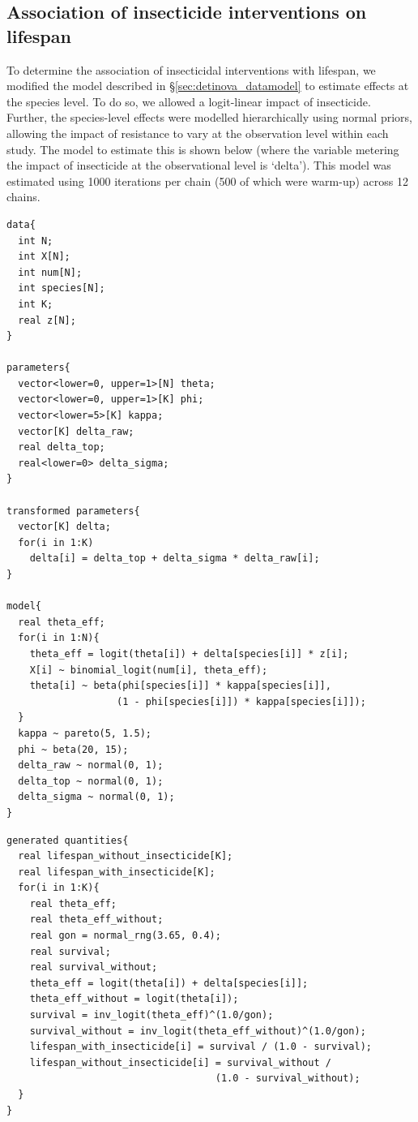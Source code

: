 \documentclass[12pt]{article}
\begin{document}
{\subsection{Association of insecticide interventions on lifespan}\label{sec:detinova_insecticide}
To determine the association of insecticidal interventions with lifespan, we modified the model described in \S\ref{sec:detinova_datamodel} to estimate effects at the species level. To do so, we allowed a logit-linear impact of insecticide. Further, the species-level effects were modelled hierarchically using normal priors, allowing the impact of resistance to vary at the observation level within each study. The model to estimate this is shown below (where the variable metering the impact of insecticide at the observational level is `delta'). This model was estimated using 1000 iterations per chain (500 of which were warm-up) across 12 chains.

\begin{verbatim}
data{
  int N;
  int X[N];
  int num[N];
  int species[N];
  int K;
  real z[N];
}

parameters{
  vector<lower=0, upper=1>[N] theta;
  vector<lower=0, upper=1>[K] phi;
  vector<lower=5>[K] kappa;
  vector[K] delta_raw;
  real delta_top;
  real<lower=0> delta_sigma;
}

transformed parameters{
  vector[K] delta;
  for(i in 1:K)
    delta[i] = delta_top + delta_sigma * delta_raw[i];
}

model{
  real theta_eff;
  for(i in 1:N){
    theta_eff = logit(theta[i]) + delta[species[i]] * z[i];
    X[i] ~ binomial_logit(num[i], theta_eff);
    theta[i] ~ beta(phi[species[i]] * kappa[species[i]],
                   (1 - phi[species[i]]) * kappa[species[i]]);
  }
  kappa ~ pareto(5, 1.5);
  phi ~ beta(20, 15);
  delta_raw ~ normal(0, 1);
  delta_top ~ normal(0, 1);
  delta_sigma ~ normal(0, 1);
}
\end{verbatim}

\begin{verbatim}
generated quantities{
  real lifespan_without_insecticide[K];
  real lifespan_with_insecticide[K];
  for(i in 1:K){
    real theta_eff;
    real theta_eff_without;
    real gon = normal_rng(3.65, 0.4);
    real survival;
    real survival_without;
    theta_eff = logit(theta[i]) + delta[species[i]];
    theta_eff_without = logit(theta[i]);
    survival = inv_logit(theta_eff)^(1.0/gon);
    survival_without = inv_logit(theta_eff_without)^(1.0/gon);
    lifespan_with_insecticide[i] = survival / (1.0 - survival);
    lifespan_without_insecticide[i] = survival_without /
                                    (1.0 - survival_without);
  }
}
\end{verbatim}

}
\end{document}

